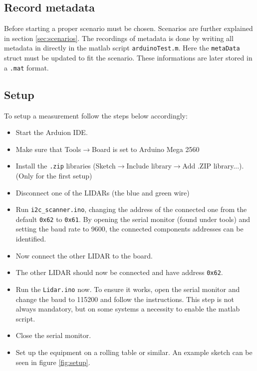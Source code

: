 \documentclass[a4paper,twoside, 12pt]{article}
\begin{document}
\subsection{Record metadata}
Before starting a proper scenario must be chosen. Scenarios are further explained in section \ref{sec:scenarios}. The recordings of metadata is done by writing all metadata in directly in the matlab script \texttt{arduinoTest.m}. Here the \texttt{metaData} struct must be updated to fit the scenario. These informations are later stored in a \texttt{.mat} format.

\subsection{Setup}
To setup a measurement follow the steps below accordingly:
\begin{itemize}
	\item Start the Arduion IDE.
	\item Make sure that Tools$\rightarrow$Board is set to Arduino Mega 2560
	\item Install the \texttt{.zip} libraries (Sketch$\rightarrow$Include library$\rightarrow$Add .ZIP library...). (Only for the first setup)
	\item Disconnect one of the LIDARs (the blue and green wire)
	\item Run \texttt{i2c\_scanner.ino}, changing the address of the connected one from the default \texttt{0x62} to \texttt{0x61}. By opening the serial monitor (found under tools) and setting the baud rate to 9600, the connected components addresses can be identified.
	\item Now connect the other LIDAR to the board.
	\item The other LIDAR should now be connected and have address \texttt{0x62}.
	\item Run the \texttt{Lidar.ino} now. To ensure it works, open the serial monitor and change the baud to 115200 and follow the instructions. This step is not always mandatory, but on some systems a necessity to enable the matlab script. 
	\item Close the serial monitor.
 	\item Set up the equipment on a rolling table or similar. An example sketch can be seen in figure \ref{fig:setup}.
\end{itemize}
\end{document}
